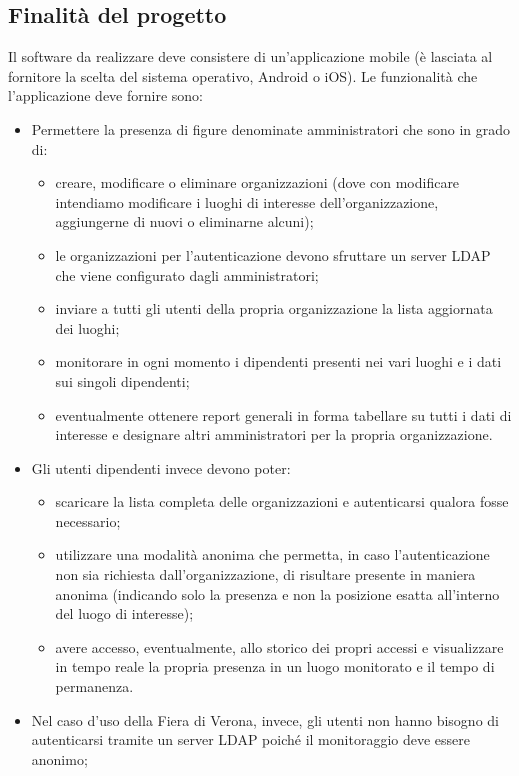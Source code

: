 \documentclass[../studio-di-fattibilita.tex]{subfiles}
\begin{document}
  \subsection{Finalità del progetto}%
  \label{subsec:finalita_del_progetto}
  Il software da realizzare deve consistere di un'applicazione mobile (è lasciata al fornitore la scelta del sistema operativo, Android o iOS). Le funzionalità che l'applicazione deve fornire sono:
  \begin{itemize}
    \item Permettere la presenza di figure denominate amministratori che sono in grado di:
    \begin{itemize}
        \item creare, modificare o eliminare organizzazioni (dove con modificare intendiamo modificare i luoghi di interesse dell’organizzazione, aggiungerne di nuovi o eliminarne alcuni);
        \item le organizzazioni per l’autenticazione devono sfruttare un server LDAP che viene configurato dagli amministratori;
        \item inviare a tutti gli utenti della propria organizzazione la lista aggiornata dei luoghi;
        \item monitorare in ogni momento i dipendenti presenti nei vari luoghi e i dati sui singoli dipendenti;
        \item eventualmente ottenere report generali in forma tabellare su tutti i dati di interesse e designare altri amministratori per la propria organizzazione.
    \end{itemize}
    \item Gli utenti dipendenti invece devono poter:
    \begin{itemize}
        \item scaricare la lista completa delle organizzazioni e autenticarsi qualora fosse necessario;
        \item utilizzare una modalità anonima che permetta, in caso l’autenticazione non sia richiesta dall’organizzazione, di risultare presente in maniera anonima (indicando solo la presenza e non la posizione esatta all’interno del luogo di interesse);
        \item avere accesso, eventualmente, allo storico dei propri accessi e visualizzare in tempo reale la propria presenza in un luogo monitorato e il tempo di permanenza.
    \end{itemize}
    \item Nel caso d’uso della Fiera di Verona, invece, gli utenti non hanno bisogno di autenticarsi tramite un server LDAP poiché il monitoraggio deve essere anonimo;

\end{itemize}
\end{document}
